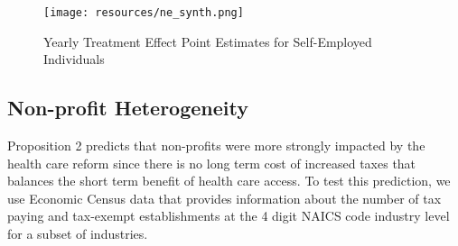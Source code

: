 \documentclass[12pt]{article}
\begin{document}
\begin{figure}[H]
	\centering
	\texttt{[image: resources/ne\_synth.png]}
	\caption{Yearly Treatment Effect Point Estimates for Self-Employed Individuals}
	\label{fig:state_contrast}
\end{figure}

\begin{comment}
\begin{figure}[H]
	\centering
	\begin{subfigure}[b]{0.495\textwidth}
		\texttt{[image: tmp/graphpoint\_diff\_se\_pop\_new\_england]}
		\caption{Other New England states as control}
	\end{subfigure}
		\begin{subfigure}[b]{0.495\textwidth}
		\texttt{[image: tmp/graphpoint\_diff\_se\_pop\_synthetic]}
		\caption{Synthetic control}
	\end{subfigure}
	\caption{Treatment Effect for Self-Employed Individuals}
	\label{fig:state_contrast}
\end{figure}
\end{comment}

\subsection{Non-profit Heterogeneity}

Proposition 2 predicts that non-profits were more strongly impacted by the health care reform since there is no long term cost of increased taxes that balances the short term benefit of health care access. To test this prediction, we use Economic Census data that provides information about the number of tax paying and tax-exempt establishments at the 4 digit NAICS code industry level for a subset of industries.  
\end{document}
